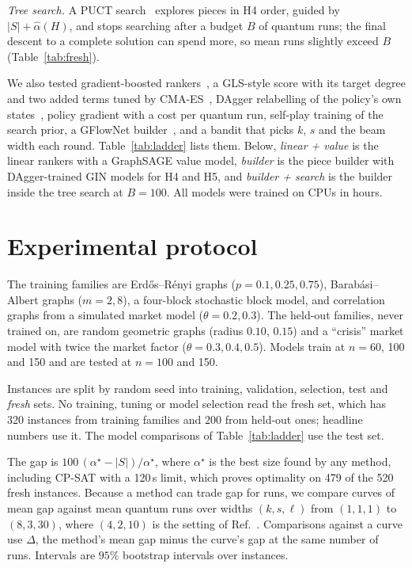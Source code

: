 \documentclass[10pt,pra,aps,twocolumn,superscriptaddress,floatfix,nofootinbib]{revtex4-2}
\newcommand{\GLS}{GLS}
\begin{document}
\textit{Tree search.} A PUCT search~\cite{silver2017mastering} explores pieces in H4 order, guided by $|S| + \hat\alpha(H)$, and stops searching after a budget $B$ of quantum runs; the final descent to a complete solution can spend more, so mean runs slightly exceed $B$ (Table~\ref{tab:fresh}).

We also tested gradient-boosted rankers~\cite{ke2017lightgbm}, a \GLS{}-style score with its target degree and two added terms tuned by CMA-ES~\cite{hansen2001cma}, DAgger relabelling of the policy's own states~\cite{ross2011dagger}, policy gradient with a cost per quantum run, self-play training of the search prior, a GFlowNet builder~\cite{bengio2021gflownet}, and a bandit that picks $k$, $s$ and the beam width each round. Table~\ref{tab:ladder} lists them. Below, \emph{linear + value} is the linear rankers with a GraphSAGE value model, \emph{builder} is the piece builder with DAgger-trained GIN models for H4 and H5, and \emph{builder + search} is the builder inside the tree search at $B=100$. All models were trained on CPUs in hours.

\section{Experimental protocol}
\label{sec:protocol}

The training families are Erd\H{o}s--R\'enyi graphs ($p = 0.1, 0.25, 0.75$), Barab\'asi--Albert graphs ($m = 2, 8$), a four-block stochastic block model, and correlation graphs from a simulated market model ($\theta = 0.2, 0.3$). The held-out families, never trained on, are random geometric graphs (radius $0.10$, $0.15$) and a ``crisis'' market model with twice the market factor ($\theta = 0.3, 0.4, 0.5$). Models train at $n = 60$, 100 and 150 and are tested at $n = 100$ and 150.

Instances are split by random seed into training, validation, selection, test and \emph{fresh} sets. No training, tuning or model selection read the fresh set, which has 320 instances from training families and 200 from held-out ones; headline numbers use it. The model comparisons of Table~\ref{tab:ladder} use the test set.

The gap is $100\,(\alpha^\star - |S|)/\alpha^\star$, where $\alpha^\star$ is the best size found by any method, including CP-SAT with a 120\,s limit, which proves optimality on 479 of the 520 fresh instances. Because a method can trade gap for runs, we compare curves of mean gap against mean quantum runs over widths $(k,s,\ell)$ from $(1,1,1)$ to $(8,3,30)$, where $(4,2,10)$ is the setting of Ref.~\cite{cazals2025gadgets}. Comparisons against a curve use $\Delta$, the method's mean gap minus the curve's gap at the same number of runs. Intervals are $95\%$ bootstrap intervals over instances.
\end{document}
